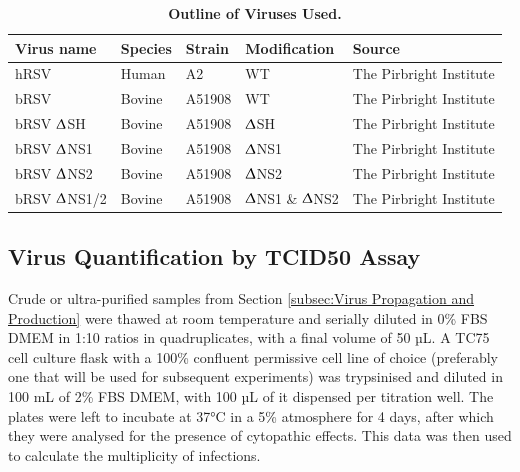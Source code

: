 \begin{table}
\centering
\begin{tabular}{lllll}
\toprule
{\textbf{Virus name}} &
  {\textbf{Species}} &
  { \textbf{Strain}} &
  { \textbf{Modification}} &
  { \textbf{Source}} \\ \midrule
hRSV      & Human  & A2     & WT   & The Pirbright Institute \\ 
bRSV      & Bovine & A51908 & WT   & The Pirbright Institute \\ 
bRSV $\Updelta$SH  & Bovine & A51908 & $\Updelta$SH  & The Pirbright Institute \\ 
bRSV $\Updelta$NS1 & Bovine & A51908 & $\Updelta$NS1 & The Pirbright Institute \\ 
bRSV $\Updelta$NS2 & Bovine & A51908 & $\Updelta$NS2 & The Pirbright Institute \\ 
bRSV $\Updelta$NS1/2 &
  Bovine &
  A51908 &
  $\Updelta$NS1 \& $\Updelta$NS2 & The Pirbright Institute \\ 
  \bottomrule
\end{tabular}
\caption[Outline of Viruses Used.]{\textbf{Outline of Viruses Used.}}
\label{tab:Outline of Viruses Used table}
\end{table}

\subsection{Virus Quantification by TCID50 Assay} \label{subsec:Virus Quantification by TCID50 Assay}
Crude or ultra-purified samples from Section \ref{subsec:Virus Propagation and Production} were thawed at room temperature and serially diluted in 0\% FBS DMEM in 1:10 ratios in quadruplicates, with a final volume of 50 µL. A TC75 cell culture flask with a 100\% confluent permissive cell line of choice (preferably one that will be used for subsequent experiments) was trypsinised and diluted in 100 mL of 2\% FBS DMEM, with 100 µL of it dispensed per titration well. The plates were left to incubate at 37°C in a 5\%  atmosphere for 4 days, after which they were analysed for the presence of cytopathic effects. This data was then used to calculate the multiplicity of infections.

